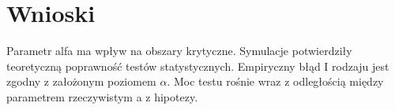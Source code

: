 \documentclass[12pt, a4paper]{article}
\begin{document}
	\section{Wnioski}
	Parametr alfa ma wpływ na obszary krytyczne.
	Symulacje potwierdziły teoretyczną poprawność testów statystycznych. Empiryczny błąd I rodzaju jest zgodny z założonym poziomem $\alpha$. Moc testu rośnie wraz z odległością między parametrem rzeczywistym a z hipotezy. 
\end{document}
